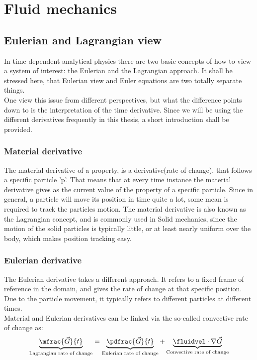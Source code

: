 \documentclass[../main.tex]{subfiles}
\begin{document}
\setlength{\delimitershortfall}{0pt}

\section{Fluid mechanics}\label{sec:fluid_mechanics}
\subsection{Eulerian and Lagrangian view}\label{sec:eulerian_lagrangian}
In time dependent analytical physics there are two basic concepts of how to view a system of interest: the Eulerian and the Lagrangian approach. It shall be stressed here, that Eulerian view and Euler equations are two totally separate things.\\
One view this issue from different perspectives, but what the difference points down to is the interpretation of the time derivative. Since we will be using the different derivatives frequently in this thesis, a short introduction shall be provided.
\subsubsection{Material derivative}
The material derivative of a property, is a derivative(rate of change), that follows a specific particle 'p'. That means that at every time instance the material derivative gives as the current value of the property of a specific particle. Since in general, a particle will move its position in time quite a lot, some mean is required to track the particles motion. The material derivative is also known as the Lagrangian concept, and is commonly used in Solid mechanics, since the motion of the solid particles is typically little, or at least nearly uniform over the body, which makes position tracking easy.

\subsubsection{Eulerian derivative}
The Eulerian derivative takes a different approach. It refers to a fixed frame of reference in the domain, and gives the rate of change at that specific position. Due to the particle movement, it typically refers to different particles at different times.
\\
Material and Eulerian derivatives can be linked via the so-called convective rate of change as:
\begin{align}
\underbrace{\mfrac{\vec{G}}{t}}_{\text{Lagrangian rate of change}} = \underbrace{\pdfrac{\vec{G}}{t}}_{\text{Eulerian rate of change}} + \underbrace{\fluidvel\cdot\nabla\vec{G}}_{\text{Convective rate of change}}
\end{align}
\end{document}
